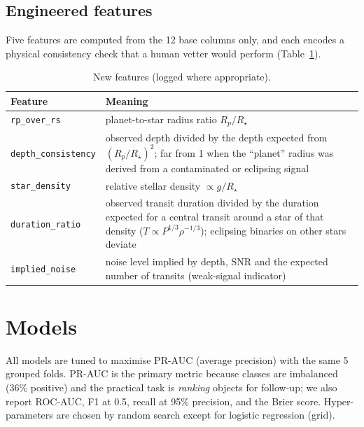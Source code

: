 \documentclass[11pt,a4paper]{article}
\newcommand{\code}[1]{\texttt{\small #1}}
\begin{document}
\subsection{Engineered features}
Five features are computed from the 12 base columns only, and each encodes a physical consistency check that a human vetter would perform (Table~\ref{tab:feats}).
\begin{table}[H]\centering\small
\begin{tabular}{@{}lp{9.2cm}@{}}\toprule
Feature & Meaning\\\midrule
\code{rp\_over\_rs} & planet-to-star radius ratio $R_p/R_\star$\\
\code{depth\_consistency} & observed depth divided by the depth expected from $(R_p/R_\star)^2$; far from 1 when the ``planet'' radius was derived from a contaminated or eclipsing signal\\
\code{star\_density} & relative stellar density $\propto g/R_\star$\\
\code{duration\_ratio} & observed transit duration divided by the duration expected for a central transit around a star of that density ($T\propto P^{1/3}\rho^{-1/3}$); eclipsing binaries on other stars deviate\\
\code{implied\_noise} & noise level implied by depth, SNR and the expected number of transits (weak-signal indicator)\\\bottomrule
\end{tabular}
\caption{New features (logged where appropriate).}\label{tab:feats}
\end{table}

\section{Models}
All models are tuned to maximise PR-AUC (average precision) with the same 5 grouped folds. PR-AUC is the primary metric because classes are imbalanced (36\% positive) and the practical task is \emph{ranking} objects for follow-up; we also report ROC-AUC, F1 at 0.5, recall at 95\% precision, and the Brier score. Hyper-parameters are chosen by random search except for logistic regression (grid).
\end{document}
